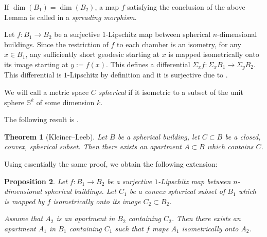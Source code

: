 \documentclass[12pt,leqno]{amsart}
\numberwithin{equation}{section}
\newtheorem{thm}{Theorem}[section]
\newtheorem{prop}[thm]{Proposition}
\theoremstyle{definition}
\theoremstyle{remark}
\begin{document}
If $\dim (B_1)=\dim (B_2)$, a  map $f$ satisfying the  conclusion of the above Lemma is called in \cite[Section 3.11]{KleinerLeeb1} a \emph{spreading morphism}.



Let $f:B_1\to B_2$ be a surjective $1$-Lipschitz map between spherical $n$-dimensional buildings.  Since the restriction of $f$ to each chamber is an isometry, for any $x\in B_1$, any sufficiently short geodesic starting at $x$ is mapped isometrically onto its image starting at $y:=f(x)$.  This defines a differential $\Sigma _x f:\Sigma _xB_1 \to \Sigma _yB_2$.  This  differential is $1$-Lipschitz by definition and it is surjective due to \cite[Lemma 3.11.1]{KleinerLeeb1}.


We will call a metric space $C$ \emph{spherical} if it isometric to a subset of the unit sphere $\mathbb S^k$ of some dimension $k$.

The  following result is \cite[Proposition 3.9.1]{KleinerLeeb1}.



\begin{thm}[Kleiner--Leeb] \label{thm-klsph}
Let $B$ be a spherical building, let $C\subset B$ be a closed, convex, spherical subset. Then there exists an apartment $A\subset B$ which contains $C$.
\end{thm}
	
	
	
 Using essentially the same proof, we obtain the following extension:	
	
	
	\begin{prop} \label{prop: main}
		Let $f:B_1\to B_2$ be a surjective $1$-Lipschitz map between $n$-dimensional spherical buildings.  Let $C_1$ be a convex spherical 
		subset of $B_1$ which is mapped by $f$ isometrically onto its image $C_2 \subset B_2$.
		
		Assume that $A_2$ is an apartment in $B_2$ containing $C_2$.  Then there exists an apartment $A_1$ in $B_1$ containing $C_1$ such that 
		$f$ maps $A_1$ isometrically onto $A_2$.		
	\end{prop}
	
	
	
\end{document}
